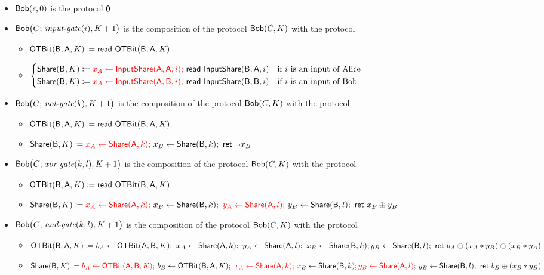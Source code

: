 \begin{itemize}
\item $\mathsf{Bob}(\epsilon,0)$ is the protocol $\mathsf{0}$
\item $\mathsf{Bob}\big(C; \, \textit{input-gate}(i),K+1\big)$ is the composition of the protocol $\mathsf{Bob}(C,K)$ with the protocol
\begin{itemize}
\item $\mathsf{OTBit}(\mathsf{B},\mathsf{A},K) \coloneqq \mathsf{read} \ \mathsf{OTBit}(\mathsf{B},\mathsf{A},K)$
\item $\begin{cases*} \Share(\B,K) \coloneqq {\color{red} x_A \leftarrow \InputShare(\A,\A,i); \ } \read{\InputShare(\B,\A,i)} & \text{if $i$ is an input of Alice} \\ \Share(\B,K) \coloneqq {\color{red} x_A \leftarrow \InputShare(\A,\B,i); \ } \read{\InputShare(\B,\B,i)} & \text{if $i$ is an input of Bob} \end{cases*}$
\end{itemize}
\item $\mathsf{Bob}\big(C; \, \textit{not-gate}(k),K+1\big)$ is the composition of the protocol $\mathsf{Bob}(C,K)$ with the protocol
\begin{itemize}
\item $\mathsf{OTBit}(\mathsf{B},\mathsf{A},K) \coloneqq \mathsf{read} \ \mathsf{OTBit}(\mathsf{B},\mathsf{A},K)$
\item $\Share(\B,K) \coloneqq {\color{red} x_A \leftarrow \Share(\A,k); \ } x_B \leftarrow \Share(\B,k); \ \ret{\neg x_B}$
\end{itemize}
\item $\mathsf{Bob}\big(C; \, \textit{xor-gate}(k,l),K+1\big)$ is the composition of the protocol $\mathsf{Bob}(C,K)$ with the protocol
\begin{itemize}
\item $\mathsf{OTBit}(\mathsf{B},\mathsf{A},K) \coloneqq \mathsf{read} \ \mathsf{OTBit}(\mathsf{B},\mathsf{A},K)$
\item $\Share(\B,K) \coloneqq {\color{red} x_A \leftarrow \Share(\A,k); \ } x_B \leftarrow \Share(\B,k); \ {\color{red} y_A \leftarrow \Share(\A,l); \ } y_B \leftarrow \Share(\B,l); \ \ret{x_B \oplus y_B}$
\end{itemize}
\item $\mathsf{Bob}\big(C; \, \textit{and-gate}(k,l),K+1\big)$ is the composition of the protocol $\mathsf{Bob}(C,K)$ with the protocol
\begin{itemize}
\item $\mathsf{OTBit}(\mathsf{B},\mathsf{A},K) \coloneqq b_A \leftarrow \mathsf{OTBit}(\mathsf{A},\mathsf{B},K); \ x_A \leftarrow \mathsf{Share}(\mathsf{A},k); \ y_A \leftarrow \mathsf{Share}(\mathsf{A},l); \ x_B \leftarrow \mathsf{Share}(\mathsf{B},k); \\ y_B \leftarrow \mathsf{Share}(\mathsf{B},l); \ \mathsf{ret} \ b_A \oplus (x_A * y_B) \oplus (x_B * y_A)$
\item $\Share(\B,K) \coloneqq {\color{red} b_A \leftarrow \OTBit(\A,\B,K); \ } b_B \leftarrow \OTBit(\B,\A,K); \ {\color{red} x_A \leftarrow \Share(\A,k); \ } x_B \leftarrow \Share(\B,k); \\ {\color{red} y_B \leftarrow \Share(\A,l); \ } y_B \leftarrow \Share(\B,l); \ \ret{b_B \oplus (x_B * y_B)}$
\end{itemize}
\end{itemize}

